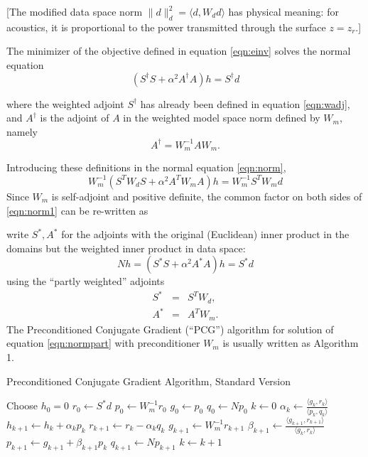 [The modified data space norm $\|d\|_d^2 = \langle d, W_d d\rangle$ has physical meaning: for acoustics, it is proportional to the power transmitted through the surface $z=z_r$.]

The minimizer of the objective defined in equation \ref{eqn:einv} solves the normal equation
\begin{equation}
  \label{eqn:norm}
  (S^{\dagger}S + \alpha^2 A^{\dagger}A)h = S^{\dagger}d 
\end{equation}

where the weighted adjoint $S^{\dagger}$ has already been defined in equation \ref{eqn:wadj}, and $A^{\dagger}$ is the adjoint of $A$ in the weighted model space norm defined by $W_m$, namely
\begin{equation}
  \label{eqn:aadj}
  A^{\dagger} = W_m^{-1}A W_m.
\end{equation}

Introducing these definitions in the normal equation \ref{eqn:norm},
\begin{equation}
  \label{eqn:norm1}
  W_m^{-1}(S^TW_dS + \alpha^2 A^TW_mA)h = W_m^{-1}S^TW_md 
\end{equation}
Since $W_m$ is self-adjoint and positive definite, the common factor on both sides of \ref{eqn:norm1} can be re-written as

write $S^*, A^*$ for the adjoints with the original (Euclidean) inner product in the domains but the weighted inner product in data space:
\begin{equation}
  \label{eqn:normpart}
  Nh = (S^*S + \alpha^2 A^*A)h = S^*d 
\end{equation}
using the ``partly weighted'' adjoints
\begin{eqnarray}
  \label{eqn:sadj}
  S^* &=& S^T W_d,\\
  A^* &=& A^T W_m.
\end{eqnarray}
The Preconditioned Conjugate Gradient (``PCG'') algorithm for solution of equation \ref{eqn:normpart} with preconditioner $W_m$ is usually written as Algorithm 1.

\begin{algorithm}[H]
\caption{Preconditioned Conjugate Gradient Algorithm, Standard Version}
\begin{algorithmic}[1]
\State Choose $h_0=0$ 
  \State $r_0 \gets S^*d$
  \State $p_0 \gets W_m^{-1}r_0$
  \State $g_0 \gets p_0$
  \State $q_0 \gets Np_0$
  \State $k \gets 0$
  \Repeat
  \State $\alpha_k \gets \frac{\langle g_k,r_k \rangle}{\langle p_k,q_k\rangle}$
  \State $h_{k+1} \gets h_k + \alpha_k p_k$
  \State $r_{k+1} \gets r_k - \alpha_kq_k$
  \State $g_{k+1} \gets W_m^{-1}r_{k+1}$
  \State $\beta_{k+1} \gets \frac{\langle g_{k+1},r_{k+1}\rangle}{\langle g_k,r_k\rangle}$
  \State $p_{k+1}\gets g_{k+1}+\beta_{k+1}p_k$
  \State $q_{k+1} \gets Np_{k+1}$
  \State $k \gets k+1$
\end{algorithmic}
\end{algorithm}

